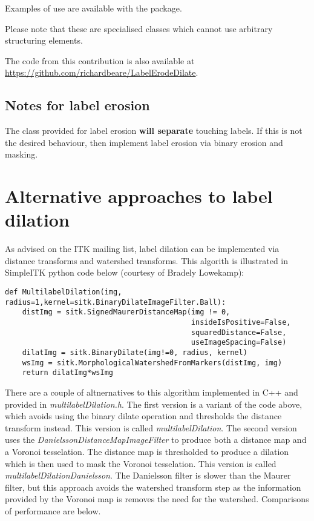 \documentclass{InsightArticle}
\begin{document}
Examples of use are available with the package.

Please note that these are specialised classes which cannot use
arbitrary structuring elements.

The code from this contribution is also available at
\url{https://github.com/richardbeare/LabelErodeDilate}.

\subsection{Notes for label erosion}
The class provided for label erosion {\bf will separate} touching
labels. If this is not the desired behaviour, then implement label
erosion via binary erosion and masking.

\section{Alternative approaches to label dilation}
As advised on the ITK mailing list, label dilation can be implemented
via distance transforms and watershed transforms. This algorith is
illustrated in SimpleITK python code below (courtesy of Bradely
Lowekamp):

\lstset{language=Python}
\begin{lstlisting}
def MultilabelDilation(img, radius=1,kernel=sitk.BinaryDilateImageFilter.Ball):
    distImg = sitk.SignedMaurerDistanceMap(img != 0,
                                           insideIsPositive=False, 
                                           squaredDistance=False, 
                                           useImageSpacing=False)
    dilatImg = sitk.BinaryDilate(img!=0, radius, kernel)
    wsImg = sitk.MorphologicalWatershedFromMarkers(distImg, img)
    return dilatImg*wsImg
\end{lstlisting}

There are a couple of altnernatives to this algorithm implemented in
C++ and provided in {\em multilabelDilation.h}. The first version is a
variant of the code above, which avoids using the binary dilate
operation and thresholds the distance transform instead. This version
is called {\em multilabelDilation}. The second version uses the {\em
DanielssonDistanceMapImageFilter} to produce both a distance map and a
Voronoi tesselation. The distance map is thresholded to produce a
dilation which is then used to mask the Voronoi tesselation. This
version is called {\em multilabelDilationDanielsson}. The Danielsson
filter is slower than the Maurer filter, but this approach avoids the
watershed transform step as the information provided by the Voronoi
map is removes the need for the watershed. Comparisons of performance
are below.
\end{document}
